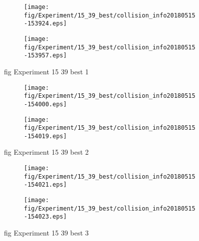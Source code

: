 \begin{figure}[H]
	\centering
	\begin{subfigure}[b]{0.9\textwidth}
		\texttt{[image: fig/Experiment/15\_39\_best/collision\_info20180515-153924.eps]}
		\caption{}
		\label{fig:Experiment:15_39_best:collision_info20180515-153924}
	\end{subfigure}

	\begin{subfigure}[b]{0.9\textwidth}
		\texttt{[image: fig/Experiment/15\_39\_best/collision\_info20180515-153957.eps]}
		\caption{}
		\label{fig:Experiment:15_39_best:collision_info20180515-153957}
	\end{subfigure}
	\caption{fig Experiment 15 39 best 1}
	\label{fig:Experiment:15_39_best:1}
\end{figure}

\begin{figure}[H]
	\centering
	\begin{subfigure}[b]{0.9\textwidth}
		\texttt{[image: fig/Experiment/15\_39\_best/collision\_info20180515-154000.eps]}
		\caption{}
		\label{fig:Experiment:15_39_best:collision_info20180515-154000}
	\end{subfigure}

	\begin{subfigure}[b]{0.9\textwidth}
		\texttt{[image: fig/Experiment/15\_39\_best/collision\_info20180515-154019.eps]}
		\caption{}
		\label{fig:Experiment:15_39_best:collision_info20180515-154019}
	\end{subfigure}
	\caption{fig Experiment 15 39 best 2}
	\label{fig:Experiment:15_39_best:2}
\end{figure}

\begin{figure}[H]
	\centering
	\begin{subfigure}[b]{0.9\textwidth}
		\texttt{[image: fig/Experiment/15\_39\_best/collision\_info20180515-154021.eps]}
		\caption{}
		\label{fig:Experiment:15_39_best:collision_info20180515-154021}
	\end{subfigure}

	\begin{subfigure}[b]{0.9\textwidth}
		\texttt{[image: fig/Experiment/15\_39\_best/collision\_info20180515-154023.eps]}
		\caption{}
		\label{fig:Experiment:15_39_best:collision_info20180515-154023}
	\end{subfigure}
	\caption{fig Experiment 15 39 best 3}
	\label{fig:Experiment:15_39_best:3}
\end{figure}

